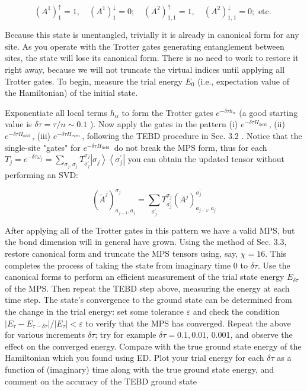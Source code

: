 \documentclass[12pt]{article}
\begin{document}
\begin{equation*}
\left(A^{1}\right)_{1}^{\uparrow}=1, \quad\left(A^{1}\right)_{1}^{\downarrow}=0 ; \quad\left(A^{2}\right)_{1,1}^{\uparrow}=1, \quad\left(A^{2}\right)_{1,1}^{\downarrow}=0 ; \text { etc. } \tag{21}
\end{equation*}


Because this state is unentangled, trivially it is already in canonical form for any site. As you operate with the Trotter gates generating entanglement between sites, the state will lose its canonical form. There is no need to work to restore it right away, because we will not truncate the virtual indices until applying all Trotter gates. To begin, measure the trial energy $E_{0}$ (i.e., expectation value of the Hamiltonian) of the initial state.

Exponentiate all local terms $h_{\alpha}$ to form the Trotter gates $e^{-\delta \tau h_{\alpha}}$ (a good starting value is $\delta \tau=\tau / n \sim 0.1$ ). Now apply the gates in the pattern (i) $e^{-\delta \tau H_{\text {field }}}$, (ii) $e^{-\delta \tau H_{\text {odd }}}$, (iii) $e^{-\delta \tau H_{\text {even }}}$, following the TEBD procedure in Sec. 3.2 . Notice that the single-site "gates" for $e^{-\delta \tau H_{\text {field }}}$ do not break the MPS form, thus for each $T_{j}=e^{-\delta \tau \omega_{j}}=\sum_{\sigma_{j}, \sigma_{j}} T_{\sigma_{j}^{\prime}}^{\sigma_{j}}\left|\sigma_{j}\right\rangle\left\langle\sigma_{j}^{\prime}\right|$ you can obtain the updated tensor without performing an SVD:


\begin{equation*}
\left(\tilde{A}^{j}\right)_{a_{j-1}, a_{j}}^{\sigma_{j}}=\sum_{\sigma_{j}^{\prime}} T_{\sigma_{j}^{\prime}}^{\sigma_{j}}\left(A^{j}\right)_{a_{j-1}, a_{j}}^{\sigma_{j}^{\prime}} \tag{22}
\end{equation*}


After applying all of the Trotter gates in this pattern we have a valid MPS, but the bond dimension will in general have grown. Using the method of Sec. 3.3, restore canonical form and truncate the MPS tensors using, say, $\chi=16$. This completes the process of taking the state from imaginary time 0 to $\delta \tau$. Use the canonical forms to perform an efficient measurement of the trial state energy $E_{\delta \tau}$ of the MPS. Then repeat the TEBD step above, measuring the energy at each time step. The state's convergence to the ground state can be determined from the change in the trial energy: set some tolerance $\varepsilon$ and check the condition $\left|E_{\tau}-E_{\tau-\delta \tau}\right| /\left|E_{\tau}\right|<\varepsilon$ to verify that the MPS has converged. Repeat the above for various increments $\delta \tau$; try for example $\delta \tau=0.1,0.01$, 0.001, and observe the effect on the converged energy. Compare with the true ground state energy of the Hamiltonian which you found using ED. Plot your trial energy for each $\delta \tau$ as a function of (imaginary) time along with the true ground state energy, and comment on the accuracy of the TEBD ground state
\end{document}
